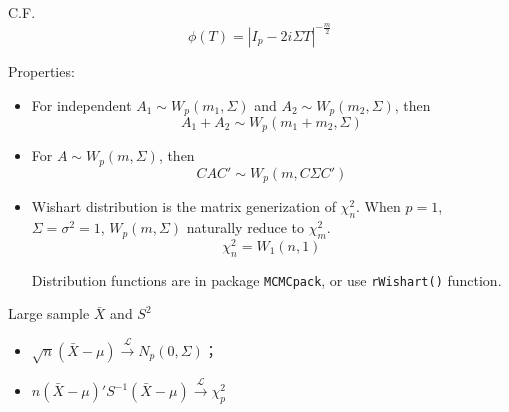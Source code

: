 \begin{itemize}[topsep=2pt,itemsep=2pt]
 
        
        C.F.
        \begin{equation}
            \phi(T)=|I_p-2i\Sigma T|^{-\frac{m}{2}} 
        \end{equation}


    Properties:
    \begin{itemize}[topsep=2pt,itemsep=2pt]
        \item For independent $ A_1\sim W_p(m_1,\Sigma ) $ and $ A_2\sim W_p(m_2,\Sigma ) $, then 
        \[
            A_{1}+A_{2} \sim W_p(m_1+m_2,\Sigma )
        \]
        
        \item For $ A\sim W_p(m,\Sigma ) $, then
        \[
            CAC'\sim W_p(m,C\Sigma C') 
        \]
        \item Wishart distribution is the matrix generization of $ \chi^2_n $. When $ p=1 $, $ \Sigma =\sigma ^2=1 $, $ W_p(m,\Sigma ) $ naturally reduce to $ \chi^2_m $.
        \[
            \chi^2_n=W_1(n,1) 
        \]
        

\begin{rcode}
    Distribution functions are in package \lstinline|MCMCpack|, or use \lstinline|rWishart()| function.
\end{rcode}
        

    
    
\end{itemize}
    
\end{itemize}

    

\begin{point}
    Large sample $ \bar{X} $ and $ S^2 $
\end{point}
\begin{itemize}[topsep=2pt,itemsep=2pt]
    \item $ \sqrt{n}(\bar{X}-\mu)\xrightarrow[]{\mathscr{L}} N_p(0,\Sigma ) $；
    \item $ n(\bar{X}-\mu)'S ^{-1}(\bar{X}-\mu)\xrightarrow[]{\mathscr{L}} \chi_p^2 $
\end{itemize}

